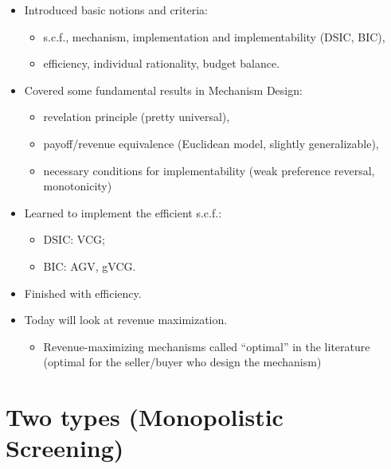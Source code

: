\documentclass[english,handout,10pt]{beamer}		%
\def\lyxframeend{} %
\begin{document}
\begin{itemize}
	\item Introduced basic notions and criteria:
	\begin{itemize}
		\item s.c.f., mechanism, implementation and implementability (DSIC, BIC),
		\item efficiency, individual rationality, budget balance.
	\end{itemize}
	\pause
	\item Covered some fundamental results in Mechanism Design:
	\begin{itemize}
		\item revelation principle (pretty universal),
		\item payoff/revenue equivalence (Euclidean model, slightly generalizable),
		\item necessary conditions for implementability (weak preference reversal, monotonicity)
	\end{itemize}
	\pause
	\item Learned to implement the efficient s.c.f.:
	\begin{itemize}
		\item DSIC: VCG;
		\item BIC: AGV, gVCG.
	\end{itemize}
\end{itemize}
\lyxframeend


\begin{itemize}
	\item Finished with efficiency.
	\item Today will look at revenue maximization.
	\begin{itemize}
		\item Revenue-maximizing mechanisms called ``optimal'' in the literature (optimal for the seller/buyer who design the mechanism)
	\end{itemize}
\end{itemize}
\lyxframeend


\section{Two types (Monopolistic Screening)}
\end{document}
